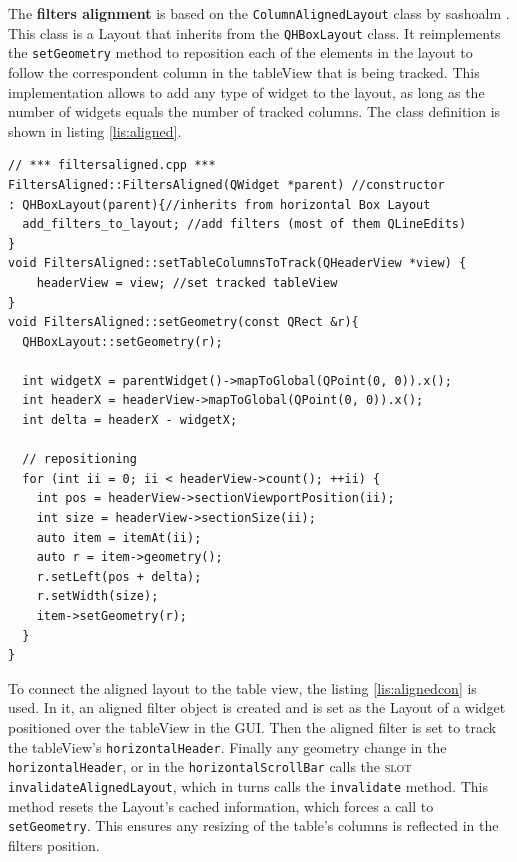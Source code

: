 The \textbf{filters alignment} is based on the \texttt{ColumnAlignedLayout} class by sashoalm \cite{aligned}. This class is a Layout that inherits from the \texttt{QHBoxLayout} class. It reimplements the \texttt{setGeometry} method to reposition each of the elements in the layout to follow the correspondent column in the tableView that is being tracked. This implementation allows to add any type of widget to the layout, as long as the number of widgets equals the number of tracked columns. The class definition is shown in listing \ref{lis:aligned}.

\begin{lstlisting}[style=customc, float=htb, caption={Aligned Filters definition}, label = {lis:aligned}]
// *** filtersaligned.cpp ***
FiltersAligned::FiltersAligned(QWidget *parent) //constructor
: QHBoxLayout(parent){//inherits from horizontal Box Layout
  add_filters_to_layout; //add filters (most of them QLineEdits)
}
void FiltersAligned::setTableColumnsToTrack(QHeaderView *view) {
    headerView = view; //set tracked tableView
}
void FiltersAligned::setGeometry(const QRect &r){
  QHBoxLayout::setGeometry(r);

  int widgetX = parentWidget()->mapToGlobal(QPoint(0, 0)).x();
  int headerX = headerView->mapToGlobal(QPoint(0, 0)).x();
  int delta = headerX - widgetX;

  // repositioning
  for (int ii = 0; ii < headerView->count(); ++ii) {
    int pos = headerView->sectionViewportPosition(ii);
    int size = headerView->sectionSize(ii);
    auto item = itemAt(ii);
    auto r = item->geometry();
    r.setLeft(pos + delta);
    r.setWidth(size);
    item->setGeometry(r);
  }
}
\end{lstlisting}

To connect the aligned layout to the table view, the listing \ref{lis:alignedcon} is used. In it, an aligned filter object is created and is set as the Layout of a widget positioned over the tableView in the GUI. Then the aligned filter is set to track the tableView's \texttt{horizontalHeader}. Finally any geometry change in the \texttt{horizontalHeader}, or in the \texttt{horizontalScrollBar} calls the \textsc{slot} \texttt{invalidateAlignedLayout}, which in turns calls the \texttt{invalidate} method. This method resets the Layout's cached information, which forces a call to \texttt{setGeometry}. This ensures any resizing of the table's columns is reflected in the filters position.


